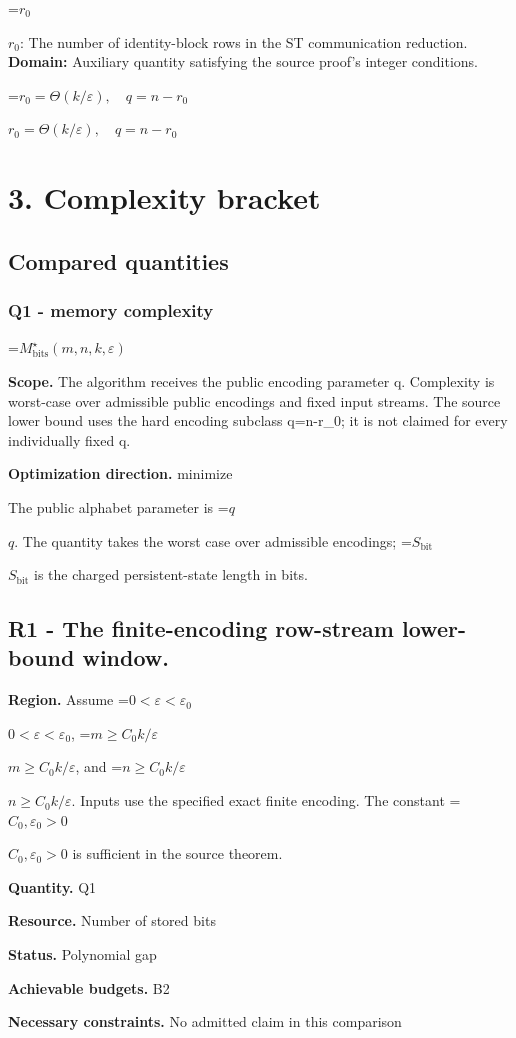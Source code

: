 \documentclass[10pt,a4paper]{article}
\newcommand{\AtlasMath}[1]{\par\begingroup\centering\setbox0=\hbox{$\displaystyle #1$}\ifdim\wd0>1.4\linewidth\typeout{ATLAS WIDE FORMULA: \the\wd0}\fi\ifdim\wd0>\linewidth\resizebox{\linewidth}{!}{\box0}\else\box0\fi\par\endgroup}
\newcommand{\AtlasInlineMath}[1]{\begingroup\setbox0=\hbox{$#1$}\ifdim\wd0>.4\linewidth\endgroup\AtlasMath{#1}\else\endgroup$#1$\fi}
\begin{document}
\AtlasInlineMath{r_0}: The number of identity-block rows in the ST communication reduction. \textbf{Domain:} Auxiliary quantity satisfying the source proof's integer conditions.

\AtlasInlineMath{r_0=\Theta(k/\varepsilon),\quad q=n-r_0}

\section{3. Complexity bracket}
\subsection{Compared quantities}
\subsubsection{Q1 - memory complexity}
\AtlasMath{M^\star_{\mathrm{bits}}(m,n,k,\varepsilon)}
\textbf{Scope.} The algorithm receives the public encoding parameter q. Complexity is worst-case over admissible public encodings and fixed input streams. The source lower bound uses the hard encoding subclass q=n-r\_\allowbreak{}0; it is not claimed for every individually fixed q.

\textbf{Optimization direction.} minimize

The public alphabet parameter is \AtlasInlineMath{q}. The quantity takes the worst case over admissible encodings; \AtlasInlineMath{S_{\mathrm{bit}}} is the charged persistent-state length in bits.

\subsection{R1 - The finite-encoding row-stream lower-bound window.}
\textbf{Region.} Assume \AtlasInlineMath{0<\varepsilon<\varepsilon_0}, \AtlasInlineMath{m\ge C_0k/\varepsilon}, and \AtlasInlineMath{n\ge C_0k/\varepsilon}. Inputs use the specified exact finite encoding. The constant \AtlasInlineMath{C_0,\varepsilon_0>0} is sufficient in the source theorem.

\textbf{Quantity.} Q1

\textbf{Resource.} Number of stored bits

\textbf{Status.} Polynomial gap

\textbf{Achievable budgets.} B2

\textbf{Necessary constraints.} No admitted claim in this comparison
\end{document}
